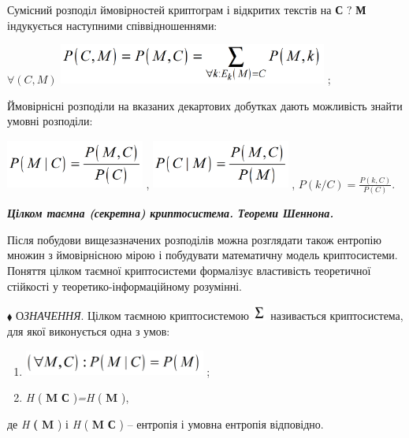 \documentclass[a4paper]{article}
\newcommand\liststyleWWviiiNumxliii{%
\renewcommand\theenumi{\arabic{enumi}}
\renewcommand\theenumii{\arabic{enumii}}
\renewcommand\theenumiii{\arabic{enumiii}}
\renewcommand\theenumiv{\arabic{enumiv}}
\renewcommand\labelenumi{\theenumi.}
\renewcommand\labelenumii{\theenumii.}
\renewcommand\labelenumiii{\theenumiii.}
\renewcommand\labelenumiv{\theenumiv.}
}
\newcounter{}
\begin{document}
Сумісний розподіл ймовірностей  криптограм і відкритих текстів на  \textbf{С}
${?}$ \textbf{М}  індукується наступними співвідношеннями:


\bigskip

{\centering
 ${\forall (C,M)}$   
\includegraphics[width=3.478in,height=0.5209in]{crypt-img/crypt-img19.png} ;
\par}

Ймовірнісні розподіли на вказаних декартових добутках дають можливість знайти
умовні розподіли:

{\centering
 \includegraphics[width=1.7902in,height=0.6354in]{crypt-img/crypt-img20.png} ,  
\includegraphics[width=1.7874in,height=0.6335in]{crypt-img/crypt-img21.png} ,  
${P(k/C)=\frac{P(k,C)}{P(C)}}$.
\par}


\bigskip


\bigskip

{\centering\bfseries\itshape
Цілком таємна (секретна)  криптосистема. Теореми  Шеннона.
\par}


\bigskip


\bigskip

Після побудови вищезазначених розподілів можна розглядати також  ентропію множин
з ймовірнісною мірою і побудувати математичну модель криптосистеми. Поняття
цілком таємної криптосистеми формалізує властивість теоретичної стійкості у
теоретико-інформаційному розумінні.


\bigskip

${\blacklozenge}$ О\textit{ЗНАЧЕННЯ}. Цілком таємною криптосистемою 
\includegraphics[width=0.1882in,height=0.2008in]{crypt-img/crypt-img22.png} 
називається криптосистема, для якої виконується одна з умов:

\liststyleWWviiiNumxliii
\begin{enumerate}
\item 
\includegraphics[width=2.3417in,height=0.3346in]{crypt-img/crypt-img23.png} ;
\item  \textit{H}\textit{ }( \textbf{M} {\textbar} \textbf{С}
)\textit{=}\textit{H}\textit{ }( \textbf{M} ), 
\end{enumerate}
де  \textit{H} \textbf{( }\textbf{M} )  і  \textit{H} (  \textbf{M}\textbf{
{\textbar} С} ) – ентропія і  умовна ентропія відповідно.
\end{document}
